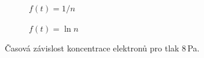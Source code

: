\documentclass[a4paper,12pt]{article}
\begin{document}
\begin{figure}[h]
	\centering
	\begin{subfigure}[b]{.49\linewidth}
		\centering
		\caption{$f(t) = 1/n$}
	\end{subfigure}
	\begin{subfigure}[b]{.49\linewidth}
		\centering
		\caption{$f(t) = \ln n$}
	\end{subfigure}
	\caption{Časová závislost koncentrace elektronů pro tlak 8\,Pa.}
	\label{g:5Pa}
\end{figure}
\end{document}
